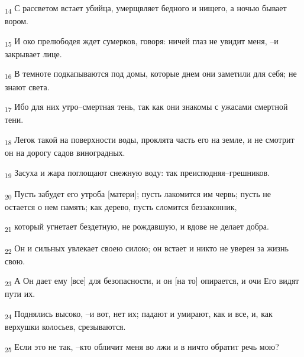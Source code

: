 \begin{tcolorbox}
\textsubscript{14} С рассветом встает убийца, умерщвляет бедного и нищего, а ночью бывает вором.
\end{tcolorbox}
\begin{tcolorbox}
\textsubscript{15} И око прелюбодея ждет сумерков, говоря: ничей глаз не увидит меня, --и закрывает лице.
\end{tcolorbox}
\begin{tcolorbox}
\textsubscript{16} В темноте подкапываются под домы, которые днем они заметили для себя; не знают света.
\end{tcolorbox}
\begin{tcolorbox}
\textsubscript{17} Ибо для них утро--смертная тень, так как они знакомы с ужасами смертной тени.
\end{tcolorbox}
\begin{tcolorbox}
\textsubscript{18} Легок такой на поверхности воды, проклята часть его на земле, и не смотрит он на дорогу садов виноградных.
\end{tcolorbox}
\begin{tcolorbox}
\textsubscript{19} Засуха и жара поглощают снежную воду: так преисподняя--грешников.
\end{tcolorbox}
\begin{tcolorbox}
\textsubscript{20} Пусть забудет его утроба [матери]; пусть лакомится им червь; пусть не остается о нем память; как дерево, пусть сломится беззаконник,
\end{tcolorbox}
\begin{tcolorbox}
\textsubscript{21} который угнетает бездетную, не рождавшую, и вдове не делает добра.
\end{tcolorbox}
\begin{tcolorbox}
\textsubscript{22} Он и сильных увлекает своею силою; он встает и никто не уверен за жизнь свою.
\end{tcolorbox}
\begin{tcolorbox}
\textsubscript{23} А Он дает ему [все] для безопасности, и он [на то] опирается, и очи Его видят пути их.
\end{tcolorbox}
\begin{tcolorbox}
\textsubscript{24} Поднялись высоко, --и вот, нет их; падают и умирают, как и все, и, как верхушки колосьев, срезываются.
\end{tcolorbox}
\begin{tcolorbox}
\textsubscript{25} Если это не так, --кто обличит меня во лжи и в ничто обратит речь мою?
\end{tcolorbox}
